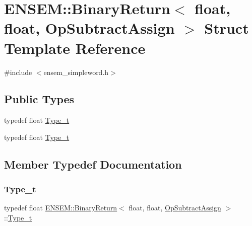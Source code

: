 \hypertarget{structENSEM_1_1BinaryReturn_3_01float_00_01float_00_01OpSubtractAssign_01_4}{}\section{E\+N\+S\+EM\+:\+:Binary\+Return$<$ float, float, Op\+Subtract\+Assign $>$ Struct Template Reference}
\label{structENSEM_1_1BinaryReturn_3_01float_00_01float_00_01OpSubtractAssign_01_4}


{\ttfamily \#include $<$ensem\+\_\+simpleword.\+h$>$}

\subsection*{Public Types}
\begin{DoxyCompactItemize}
\item 
typedef float \mbox{\hyperlink{structENSEM_1_1BinaryReturn_3_01float_00_01float_00_01OpSubtractAssign_01_4_a0b38c0b93f84d57852605cf3a65412e8}{Type\+\_\+t}}
\item 
typedef float \mbox{\hyperlink{structENSEM_1_1BinaryReturn_3_01float_00_01float_00_01OpSubtractAssign_01_4_a0b38c0b93f84d57852605cf3a65412e8}{Type\+\_\+t}}
\end{DoxyCompactItemize}


\subsection{Member Typedef Documentation}
\mbox{\label{structENSEM_1_1BinaryReturn_3_01float_00_01float_00_01OpSubtractAssign_01_4_a0b38c0b93f84d57852605cf3a65412e8}} 
\subsubsection{\texorpdfstring{Type\_t}{Type\_t}\hspace{0.1cm}{\footnotesize\ttfamily [1/2]}}
{\footnotesize\ttfamily typedef float \mbox{\hyperlink{structENSEM_1_1BinaryReturn}{E\+N\+S\+E\+M\+::\+Binary\+Return}}$<$ float, float, \mbox{\hyperlink{structENSEM_1_1OpSubtractAssign}{Op\+Subtract\+Assign}} $>$\+::\mbox{\hyperlink{structENSEM_1_1BinaryReturn_3_01float_00_01float_00_01OpSubtractAssign_01_4_a0b38c0b93f84d57852605cf3a65412e8}{Type\+\_\+t}}}


